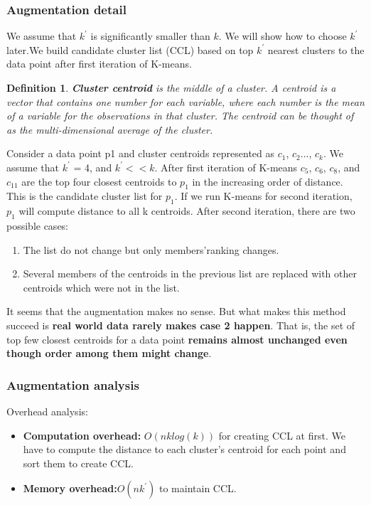 \documentclass[11pt]{article}
\newtheorem{definition}[theorem]{Definition}
\begin{document}
\subsubsection{Augmentation detail}
\par We assume that $k^{\prime}$ is significantly smaller than $k$. We will show how to choose $k^{\prime}$ later.We build candidate cluster list (CCL) based on top $k^{\prime}$ nearest clusters to the data point after first iteration of K-means. \par
\begin{definition}
\textbf{Cluster centroid} is the middle of a cluster. A centroid is a vector that contains one number for each variable, where each number is the mean of a variable for the observations in that cluster. The centroid can be thought of as the multi-dimensional average of the cluster.
\end{definition}
Consider a data point p1 and cluster centroids represented as $c_1$, $c_2$..., $c_k$. We assume that $k^{\prime}$ = 4, and $k^{\prime} << k $. After first iteration of K-means $c_5$, $c_6$, $c_8$, and $c_{11}$ are the top four closest centroids to $p_1$ in the increasing order of distance. This is the candidate cluster list for $p_1$. If we run K-means for second iteration, $p_1$ will compute distance to all k centroids. After second iteration, there are two possible cases:
\begin{enumerate}
\item The list do not change but only members'ranking changes.
\item Several members of the centroids in the previous list are replaced with other centroids which were not in the list.
\end{enumerate}
It seems that the augmentation makes no sense. But what makes this method succeed is \textbf{real world data rarely makes case 2 happen}. That is, the set of top few closest centroids for a data point \textbf{remains almost unchanged even though order among them might change}.
\subsubsection{Augmentation analysis}
Overhead analysis:
\begin{itemize}
\item \textbf{Computation overhead:} $O(nklog(k))$ for creating CCL at first. We have to compute the distance to each cluster's centroid for each point and sort them to create CCL. 
\item \textbf{Memory overhead:}$ O(nk^{\prime})$ to maintain CCL.
\end{itemize}
\par
\end{document}
